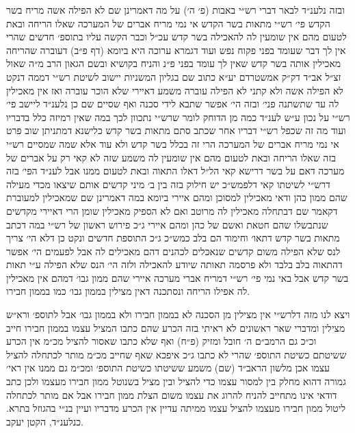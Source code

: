 \documentclass[12pt, openany]{book}
\begin{document}
\begin{multicols}{2}
ובזה נלענ״ד לבאר דברי רש״י באבות (פ׳ ה׳) על מה דאמרינן שם לא הפילה אשה מריח בשר הקדש פי׳ רש״י מתאות בשר הקדש אי נמי מריח אברים של המערכה שאלו הריחה ובאת לטעום מהם אין שומעין לה להאכילה בשר קדש עכ״ל וכבר הקשה עליו בתוספ׳ חדשים שהרי אין לך דבר שעומד בפני פקוח נפש ועוד דגמרא ערוכה היא ביומא (דף פ״ב) דעוברה שהריחה מאכילין אותה בשר קדש שאין לך עומד בפני פ״נ והניח בקושיא ובשם הגאון הרב מ״ה שאול זצ״ל אב״ד דק״ק אמשטרדם יע״א כתוב שם בגליון המשניות יישוב לשיטת רש״י דממה דנקט לא הפילה אשה ולא קתני לא הפילה עוברה משמע דאיירי שלא הוכר עוברה ואז אין מאכילין לה עד שתשתנה פני׳ ובזה הי׳ אפשר שתבא לידי סכנה ואף שסיים שם כן נלענ״ד ליישב פי׳ רש״י על נכון ע״ש לענ״ד כמה מן הדוחק לומר שרש״י נתכוון לכך במה שאין רמיזה כלל בדבריו ועוד מה זה שכפל רש״י דבריו אחר שכתב סתם מתאות בשר קדש כלישנא דמתניתן שוב פרט אי נמי מריח אברים של המערכה הרי זה בכלל בשר קדש ולא עוד אלא שמה שמסיים רש״י בזה שאלו הריחה ובאת לטעום מהם אין שומעין לה משמע שזה לא קאי רק על אברים של מערכה דאם על בשר דרישא קאי הל״ל דאלו התאוה ובאת לטעום ממנו אבל לענ״ד הפי׳ בזה דרש״י לשיטתו קאי דלפמש״כ יש חילוק בזה בין ב׳ מיני קדשים אותם שיצאו מכדי מעילה שהם ממון כהן ודאי מאכילין למסוכן ומהם איירי ביומא במה דאמרינן שם שמאכילין למעוברת דקאמר שם דבתחלה מאכילין לה מרוטב ואם לא הספיק מאכילין שומן הרי דאיירי מקדשים שנתבשלו שהם חטאת ואשם של כהן ומהם איירי ג״כ פירוש ראשון של רש״י במה דכתב מתאות בשר קדש דתאו׳ וחימוד הם בלב כמש״כ ג״כ התוספת חדשים ונקט כן דלא הי׳ צריך לנס שלא הפילה משום קדשים שנאכלים לכהנים דהם מאכילים לה אבל לפעמים הי׳ אפשר דהתאוה בלב בלבד ולא פרסמה תאותה שיודע להאכילה ולזה הי׳ הנס שלא הפילה ע״י תאות בשר קדש אבל באי נמי פי׳ רש״י דמריח אברי מערכה איירי שהם ממון גבו׳ דמהם אין מאכילין לה אפילו הריחה ונסתכנה דאין מצילין בממון גבו׳ כמו בממון חבירו.\\\vspace{0pt}

ויצא לנו מזה דלרש״י אין מצילין מן הסכנה לא בממון חבירו ולא בממון גבו׳ אבל לתוספ׳ ורא״ש מצילין ומדברי שאר ראשונים לא ראיתי בזה הכרע שהם כתבו המציל עצמו בממון חבירו חייב וכ״כ גם הרמב״ם ה׳ חובל ומזיק (פ״ח) ואף שלא כתבו שאסור להציל מכ״מ אין הכרע ששיטתם כשיטת התוספ׳ שהרי לא כתבו ג״כ איפכא שאף שחייב מכ״מ מותר לכתחלה להציל עצמו אכן מלשון הראב״ד (שם) משמע ששיטתו כשיטת התוספ׳ ומכ״מ גם ממנו אין ראי׳ גמורה דהוא מחלק בין למסור עצמו כדי להציל ובין מציל בשנוטל ממון חבירו מעצמו ולכן כתב דודאי אינו מתחייב להניח להרוג את עצמו משום הצלת ממון חבירו אבל אם מותר לכתחלה ליטול ממון חבירו מעצמו להציל עצמו ממיתה עדיין אין הכרע מדבריו ועיין בנ״י בהגוזל בתרא. כנלענ״ד, הקטן יעקב.\\\vspace{0pt}

\end{multicols}\newpage
\end{document}
